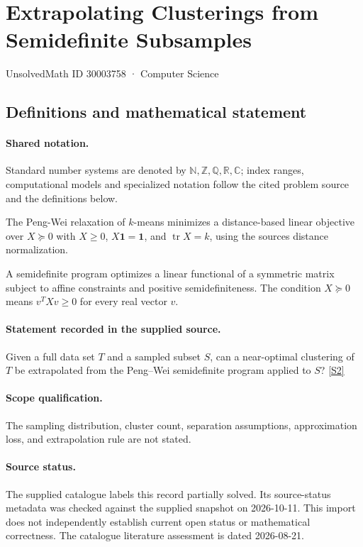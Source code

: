 \documentclass[11pt]{article}
\newcommand{\sref}[2]{\hyperlink{source:#1:#2}{[S#2]}}
\begin{document}
\setcounter{section}{30003757}
\section{Extrapolating Clusterings from Semidefinite Subsamples}\label{30003758}
{\small\sffamily UnsolvedMath ID 30003758 · Computer Science}
\subsection{Definitions and mathematical statement}

\paragraph{Shared notation.}Standard number systems are denoted by $\mathbb N,\mathbb Z,\mathbb Q,\mathbb R,\mathbb C$; index ranges, computational models and specialized notation follow the cited problem source and the definitions below.


The Peng-Wei relaxation of $k$-means minimizes a distance-based linear objective over $X\succeq0$ with $X\geq0$, $X\mathbf1=\mathbf1$, and $\operatorname{tr}X=k$, using the source\textquotesingle s distance normalization.

A semidefinite program optimizes a linear functional of a symmetric matrix subject to affine constraints and positive semidefiniteness. The condition $X\succeq0$ means $v^TXv\geq0$ for every real vector $v$.
\paragraph{Statement recorded in the supplied source.}
Given a full data set $T$ and a sampled subset $S$, can a near-optimal clustering of $T$ be extrapolated from the Peng–Wei semidefinite program applied to $S$? \sref{30003758}{2}
\paragraph{Scope qualification.}
The sampling distribution, cluster count, separation assumptions, approximation loss, and extrapolation rule are not stated.
\paragraph{Source status.}
The supplied catalogue labels this record partially solved. Its source-status metadata was checked against the supplied snapshot on 2026-10-11. This import does not independently establish current open status or mathematical correctness. The catalogue literature assessment is dated 2026-08-21.
\end{document}
